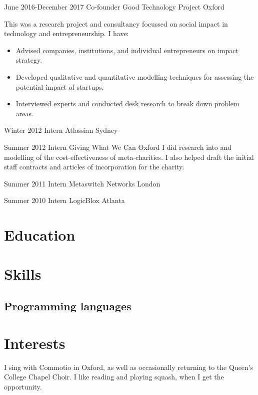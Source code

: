 \documentclass[12pt,a4paper,sans]{moderncv}
\begin{document}
\cventry
{June 2016-December 2017}
{Co-founder}
{Good Technology Project}
{Oxford}
{}
{
  This was a research project and consultancy focussed on social impact in technology and
  entrepreneurship. I have:
  \begin{itemize}
    \item Advised companies, institutions, and individual entrepreneurs on impact strategy.
    \item Developed qualitative and quantitative modelling techniques for
      assessing the potential impact of startups.
    \item Interviewed experts and conducted desk research to break down problem areas.
  \end{itemize}
}

\cventry
{Winter 2012}
{Intern}
{Atlassian}
{Sydney}
{}
{}

\cventry
{Summer 2012}
{Intern}
{Giving What We Can}
{Oxford}
{}
{
  I did research into and modelling of the cost-effectiveness of meta-charities.
  I also helped draft the initial staff contracts and articles of incorporation for the charity.
}

\cventry
{Summer 2011}
{Intern}
{Metaswitch Networks}
{London}
{}
{}

\cventry
{Summer 2010}
{Intern}
{LogicBlox}
{Atlanta}
{}
{}

\nocite{*}
\printbibliography[title={Publications}]

\section{Education}

\section{Skills}

\subsection{Programming languages}


\section{Interests}
I sing with Commotio in Oxford, as well as occasionally returning to the Queen's
College Chapel Choir. I like reading and playing squash, when I get the opportunity.
\end{document}
